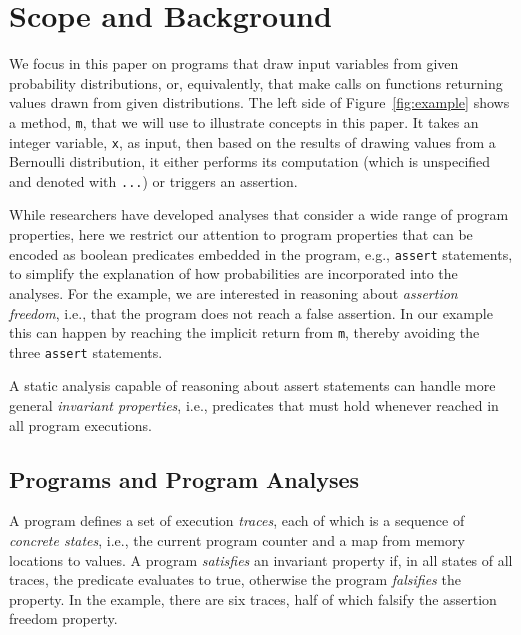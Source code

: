 \section{Scope and Background}
\label{sec:background}



We focus in this paper on programs that draw input variables
from given probability distributions, or, equivalently, that make
calls on functions returning values drawn from given distributions.
The left side of Figure~\ref{fig:example} shows a method,
\texttt{m}, that we will use to illustrate concepts in this paper.     
It takes an integer variable, \texttt{x}, as input, then based on the 
results of drawing values from a Bernoulli distribution,
it either performs its computation
(which is unspecified and denoted with \texttt{...}) or triggers
an assertion. 

While researchers have developed analyses that consider a wide
range of program properties, here
we restrict our attention to program
properties that can be encoded as boolean predicates 
embedded in the program,
e.g., \texttt{assert} statements, to simplify the explanation
of how probabilities are incorporated into the analyses.
For the example, we are interested in reasoning about
\textit{assertion freedom}, i.e., that the program does
not reach a false assertion.
In our example
this can happen by reaching the implicit return from \texttt{m},
thereby avoiding the three \texttt{assert} statements.

A static analysis capable of reasoning about assert statements 
can handle more general \textit{invariant properties}, i.e., 
predicates that must hold whenever reached in all program executions.  

\subsection{Programs and Program Analyses}
A program defines a set of execution \textit{traces}, each of
which is a sequence of \textit{concrete states}, i.e., 
the current program counter and a map from memory locations to values.
A program \textit{satisfies} an invariant property if, in all states of 
all traces, the predicate evaluates to true, otherwise the program
\textit{falsifies} the property.
In the example, there are six traces, half of which falsify the assertion
freedom property.

